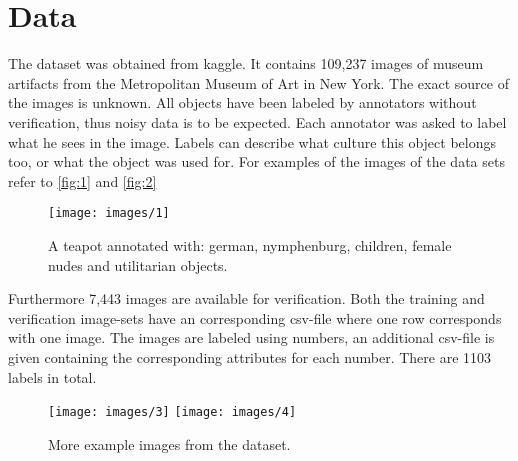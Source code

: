 
\section{Data}
The dataset was obtained from kaggle\cite{imet}.
It contains 109,237 images of museum artifacts from the Metropolitan Museum of Art in New York.
The exact source of the images is unknown.
All objects have been labeled by  annotators without verification, thus noisy data is to be expected.
Each annotator was asked to label what he sees in the image.
Labels can describe what culture this object belongs too, or what the object was used for.
For examples of the images of the data sets refer to \autoref{fig:1} and \autoref{fig:2}
\begin{figure}[h]
    \texttt{[image: images/1]}
    \caption{A teapot annotated with: german, nymphenburg, children, female nudes and utilitarian objects.}
    \label{fig:1}
\end{figure}
Furthermore 7,443 images are available for verification.
Both the training and verification image-sets have an corresponding csv-file where one row corresponds with one image.
The images are labeled using numbers, an additional csv-file is given containing the corresponding attributes for each number.
There are 1103 labels in total.
\begin{figure}[h]
    \texttt{[image: images/3]}
    \texttt{[image: images/4]}
    \caption{More example images from the dataset.}
    \label{fig:2}
\end{figure}
